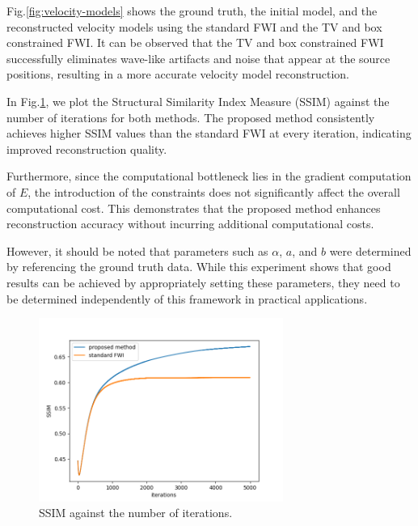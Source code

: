 Fig.\ref{fig:velocity-models} shows the ground truth, the initial model, and the reconstructed velocity models using the standard FWI and the TV and box constrained FWI.
It can be observed that the TV and box constrained FWI successfully eliminates wave-like artifacts and noise that appear at the source positions, resulting in a more accurate velocity model reconstruction.

In Fig.\ref{fig:ssim}, we plot the Structural Similarity Index Measure (SSIM) against the number of iterations for both methods.
The proposed method consistently achieves higher SSIM values than the standard FWI at every iteration, indicating improved reconstruction quality.

Furthermore, since the computational bottleneck lies in the gradient computation of $E$, the introduction of the constraints does not significantly affect the overall computational cost.
This demonstrates that the proposed method enhances reconstruction accuracy without incurring additional computational costs.

However, it should be noted that parameters such as $\alpha$, $a$, and $b$ were determined by referencing the ground truth data.
While this experiment shows that good results can be achieved by appropriately setting these parameters, they need to be determined independently of this framework in practical applications.


\begin{figure}[htbp]
\vspace{-\baselineskip}
\begin{center}
    \includegraphics[width=80mm]{public/ssim}
    \caption{SSIM against the number of iterations.}
    \label{fig:ssim}
\end{center}
\vspace{-\baselineskip}
\end{figure}
